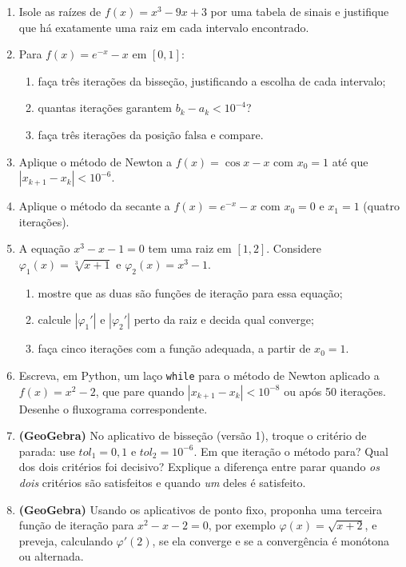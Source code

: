 \begin{enumerate}[label=\textbf{\arabic*.},leftmargin=*]
\item Isole as raízes de $f(x)=x^3-9x+3$ por uma tabela de sinais e justifique que há exatamente
  uma raiz em cada intervalo encontrado.

\item Para $f(x)=e^{-x}-x$ em $[0,1]$:
  \begin{enumerate}[label=(\alph*),nosep]
  \item faça três iterações da bisseção, justificando a escolha de cada intervalo;
  \item quantas iterações garantem $b_k-a_k<10^{-4}$?
  \item faça três iterações da posição falsa e compare.
  \end{enumerate}

\item Aplique o método de Newton a $f(x)=\cos x-x$ com $x_0=1$ até que
  $|x_{k+1}-x_k|<10^{-6}$.

\item Aplique o método da secante a $f(x)=e^{-x}-x$ com $x_0=0$ e $x_1=1$ (quatro iterações).

\item A equação $x^3-x-1=0$ tem uma raiz em $[1,2]$. Considere
  $\varphi_1(x)=\sqrt[3]{x+1}$ e $\varphi_2(x)=x^3-1$.
  \begin{enumerate}[label=(\alph*),nosep]
  \item mostre que as duas são funções de iteração para essa equação;
  \item calcule $|\varphi_1'|$ e $|\varphi_2'|$ perto da raiz e decida qual converge;
  \item faça cinco iterações com a função adequada, a partir de $x_0=1$.
  \end{enumerate}

\item Escreva, em Python, um laço \texttt{while} para o método de Newton aplicado a
  $f(x)=x^2-2$, que pare quando $|x_{k+1}-x_k|<10^{-8}$ ou após 50 iterações. Desenhe o fluxograma
  correspondente.

\item \textbf{(GeoGebra)} No aplicativo de bisseção (versão 1), troque o critério de parada:
  use $tol_1=0{,}1$ e $tol_2=10^{-6}$. Em que iteração o método para? Qual dos dois critérios foi
  decisivo? Explique a diferença entre parar quando \emph{os dois} critérios são satisfeitos e quando
  \emph{um} deles é satisfeito.

\item \textbf{(GeoGebra)} Usando os aplicativos de ponto fixo, proponha uma terceira função de
  iteração para $x^2-x-2=0$, por exemplo $\varphi(x)=\sqrt{x+2}$, e preveja, calculando
  $\varphi'(2)$, se ela converge e se a convergência é monótona ou alternada.
\end{enumerate}

